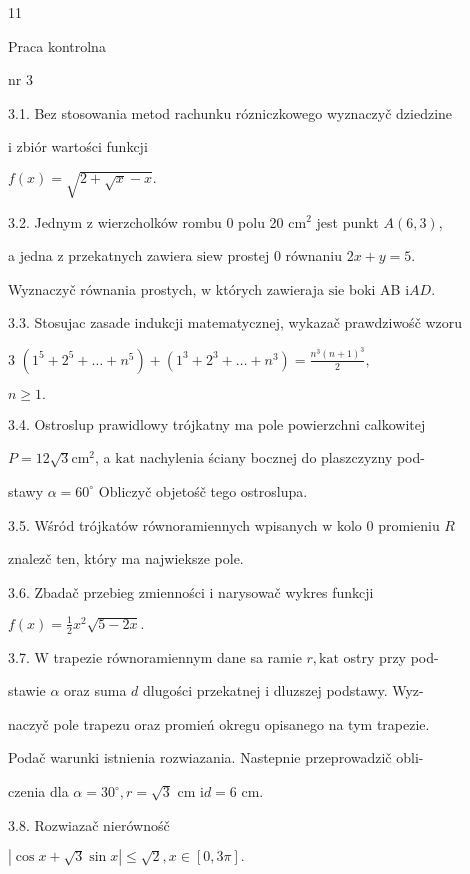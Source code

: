 \documentclass[a4paper,12pt]{article}
\begin{document}
11

Praca kontrolna

nr 3

3.1. Bez stosowania metod rachunku rózniczkowego wyznaczyč dziedzine

i zbiór wartości funkcji

$f(x)=\sqrt{2+\sqrt{x}-x}.$

3.2. Jednym $\mathrm{z}$ wierzcholków rombu $0$ polu 20 $\mathrm{c}\mathrm{m}^{2}$ jest punkt $A(6,3)$,

a jedna $\mathrm{z}$ przekatnych zawiera $\mathrm{s}\mathrm{i}\mathrm{e}\mathrm{w}$ prostej $0$ równaniu $2x+y=5.$

Wyznaczyč równania prostych, $\mathrm{w}$ których zawieraja $\mathrm{s}\mathrm{i}\mathrm{e}$ boki AB $\mathrm{i}AD.$

3.3. Stosujac zasade indukcji matematycznej, wykazač prawdziwośč wzoru

3 $(1^{5}+2^{5}+\displaystyle \ldots+n^{5})+(1^{3}+2^{3}+\ldots+n^{3})=\frac{n^{3}(n+1)^{3}}{2},$

$n\geq 1.$

3.4. Ostroslup prawidlowy trójkatny ma pole powierzchni calkowitej

$P=12\sqrt{3}\mathrm{c}\mathrm{m}^{2}$, a $\mathrm{k}\mathrm{a}\mathrm{t}$ nachylenia ściany bocznej do plaszczyzny pod-

stawy $\alpha=60^{\circ}$ Obliczyč objetośč tego ostroslupa.

3.5. Wśród trójkatów równoramiennych wpisanych $\mathrm{w}$ kolo $0$ promieniu $R$

znalez$\acute{}$č ten, który ma najwieksze pole.

3.6. Zbadač przebieg zmienności $\mathrm{i}$ narysowač wykres funkcji

$f(x)=\displaystyle \frac{1}{2}x^{2}\sqrt{5-2x}.$

3.7. $\mathrm{W}$ trapezie równoramiennym dane sa ramie $r, \mathrm{k}\mathrm{a}\mathrm{t}$ ostry przy pod-

stawie $\alpha$ oraz suma $d$ dlugości przekatnej $\mathrm{i}$ dluzszej podstawy. Wyz-

naczyč pole trapezu oraz promień okregu opisanego na tym trapezie.

Podač warunki istnienia rozwiazania. Nastepnie przeprowadzič obli-

czenia dla $\alpha=30^{\circ}, r=\sqrt{3}$ cm $\mathrm{i} d=6$ cm.

3.8. Rozwiazač nierównośč

$|\cos x+\sqrt{3}\sin x|\leq\sqrt{2},x\in[0,3\pi].$
\end{document}
